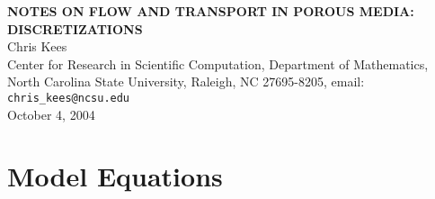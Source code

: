 \documentclass[10pt,dvips,twoside,reqno]{amsart}
\begin{document}
\begin{center}
  {\bf NOTES ON FLOW AND TRANSPORT IN POROUS MEDIA: DISCRETIZATIONS
    \\}
  Chris Kees\\
  Center for Research in Scientific Computation, Department of Mathematics, North Carolina State University, Raleigh, NC 27695-8205, email: \texttt{chris\_kees@ncsu.edu} \\
  October 4, 2004
\end{center}
\tableofcontents 

\section{Model Equations}
\end{document}
